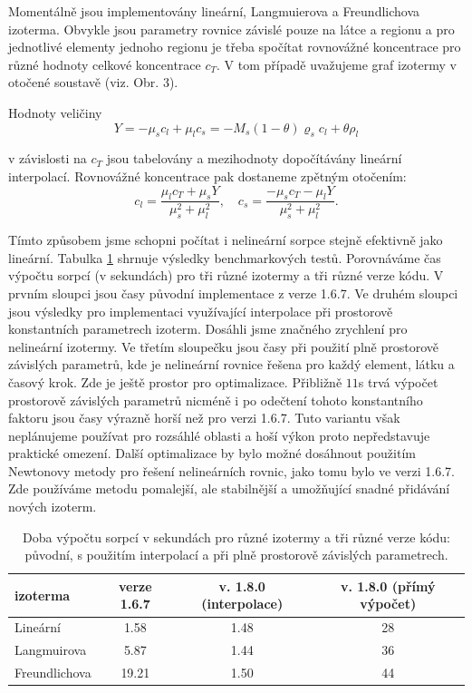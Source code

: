 \documentclass[11pt]{report}
\begin{document}
Momentálně jsou implementovány lineární, Langmuierova a Freundlichova izoterma. 
Obvykle jsou parametry rovnice závislé pouze na látce a regionu a pro 
jednotlivé elementy jednoho regionu je třeba spočítat rovnovážné koncentrace pro 
různé hodnoty celkové koncentrace $c_T$. V tom případě uvažujeme graf izotermy 
v otočené soustavě (viz. Obr. 3).

Hodnoty veličiny
\[
    Y=-\mu_s c_l + \mu_l c_s =  -M_s(1-\theta) \varrho_s c_l + \theta\rho_l 
\]

v závislosti na $c_T$ jsou tabelovány a mezihodnoty dopočítávány lineární 
interpolací. Rovnovážné koncentrace pak dostaneme zpětným otočením:
\[
    c_l = \frac{\mu_l c_T + \mu_s Y}{\mu_s^2+\mu_l^2},\quad c_s = 
\frac{-\mu_s c_T - \mu_l Y}{\mu_s^2 + \mu_l^2}.
\]

Tímto způsobem jsme schopni počítat i nelineární sorpce stejně efektivně jako 
lineární. Tabulka \ref{tab:isoterm_timing} shrnuje výsledky benchmarkových 
testů. Porovnáváme čas výpočtu sorpcí (v sekundách) pro tři různé izotermy a 
tři 
různé verze kódu. V prvním sloupci jsou časy původní implementace z verze 1.6.7. 
Ve druhém sloupci jsou výsledky pro implementaci využívající interpolace při 
prostorově konstantních parametrech izoterm. Dosáhli jsme značného zrychlení 
pro 
nelineární izotermy. Ve třetím sloupečku jsou časy při použití  plně prostorově 
závislých parametrů, kde je nelineární rovnice řešena pro každý element, látku 
a časový krok. Zde je ještě prostor pro optimalizace. Přibližně $11$s trvá 
výpočet prostorově závislých parametrů nicméně i po odečtení tohoto konstantního 
faktoru jsou časy výrazně horší než pro verzi 1.6.7. Tuto variantu však 
neplánujeme používat pro rozsáhlé oblasti a hoší výkon proto nepředstavuje 
praktické omezení. Další optimalizace by bylo možné dosáhnout použitím Newtonovy 
metody pro řešení nelineárních rovnic, jako tomu bylo ve verzi 1.6.7. Zde 
používáme metodu pomalejší, ale stabilnější a umožňující snadné přidávání nových 
izoterm.

\renewcommand{\arraystretch}{1.5}
\begin{table}
\begin{center}
\begin{tabular}{|l||c|c|c|}
\hline
izoterma & verze 1.6.7 & v. 1.8.0 (interpolace) & v. 1.8.0 (přímý výpočet) \\
\hline
Lineární & 1.58        & 1.48                   & 28\\
Langmuirova & 5.87     & 1.44                   & 36\\
Freundlichova& 19.21   & 1.50                   & 44\\
\hline
\end{tabular}
\end{center}
\caption{\label{tab:isoterm_timing}
Doba výpočtu sorpcí v sekundách pro různé izotermy a tři různé verze 
kódu: původní, s použitím interpolací a při plně prostorově závislých 
parametrech.}
\end{table}
\end{document}
